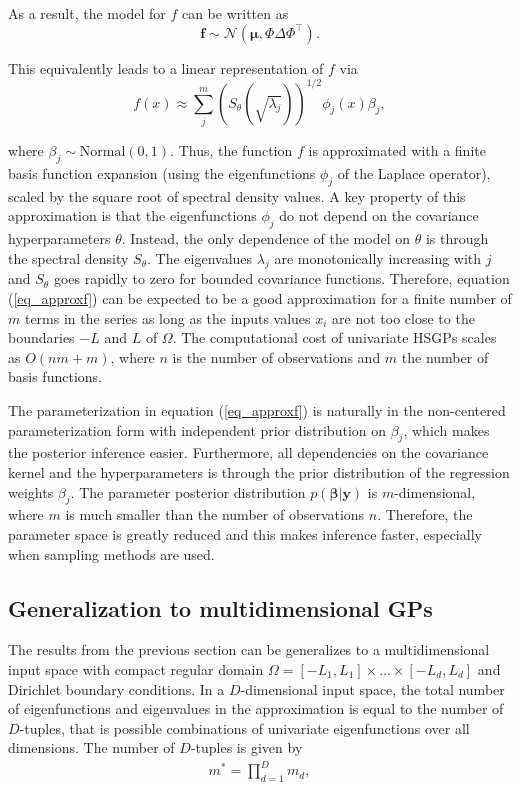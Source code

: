 \documentclass[onecolumn,a4paper,11pt]{article}
\begin{document}
\noindent As a result, the model for $f$ can be written as
%
\begin{equation}
\bm{f} \sim \mathcal{N}(\bm{\mu},\Phi \Delta \Phi^\intercal). \nonumber
\end{equation}

\noindent This equivalently leads to a linear representation of $f$ via
%
\begin{equation}\label{eq_approxf}
f(x) \approx \sum_{j}^m \left( S_{\theta}(\sqrt{\lambda_j})\right)^{1/2} \phi_j(x) \beta_j,
\end{equation}

\noindent where $\beta_j \sim \text{Normal}(0,1)$. Thus, the function $f$ is approximated with a finite basis function expansion (using the eigenfunctions $\phi_j$ of the Laplace operator), scaled by the square root of spectral density values. A key property of this approximation is that the eigenfunctions $\phi_j$ do not depend on the covariance hyperparameters $\theta$. Instead, the only dependence of the model on $\theta$ is through the spectral density $S_{\theta}$. The eigenvalues $\lambda_j$ are monotonically increasing with $j$ and $S_{\theta}$ goes rapidly to zero for bounded covariance functions. Therefore, equation (\ref{eq_approxf}) can be expected to be a good approximation for a finite number of $m$ terms in the series as long as the inputs values $x_i$ are not too close to the boundaries $-L$ and $L$ of $\Omega$. The computational cost of univariate HSGPs scales as $O(nm + m)$, where $n$ is the number of observations and $m$ the number of basis functions.

The parameterization in equation (\ref{eq_approxf}) is naturally in the non-centered parameterization form with independent prior distribution on $\beta_j$, which makes the posterior inference easier. Furthermore, all dependencies on the covariance kernel and the hyperparameters is through the prior distribution of the regression weights $\beta_j$. The parameter posterior distribution $p(\bm{\beta}|\bm{y})$ is $m$-dimensional, where $m$ is much smaller than the number of observations $n$. Therefore, the parameter space is greatly reduced and this makes inference faster, especially when sampling methods are used.

\subsection{Generalization to multidimensional GPs} \label{ch5_sec_method_multi}

The results from the previous section can be generalizes to a multidimensional input space with compact regular domain $\Omega=[-L_1,L_1] \times \dots \times [-L_d,L_d]$ and Dirichlet boundary conditions. 
In a $D$-dimensional input space, the total number of eigenfunctions and eigenvalues in the approximation is equal to the number of $D$-tuples, that is possible combinations of univariate eigenfunctions over all dimensions. The number of $D$-tuples is given by 
%
\begin{align} \label{eq_m_multi}
m^{\ast} = \prod_{d=1}^{D} m_d,
\end{align}
\end{document}
